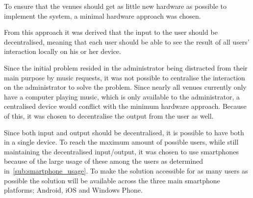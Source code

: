 To ensure that the venues should get as little new hardware as possible to implement the system, a minimal hardware approach was chosen.

From this approach it was derived that the input to the user should be decentralised, meaning that each user should be able to see the result of all users' interaction locally on his or her device.

Since the initial problem resided in the administrator being distracted from their main purpose by music requests, it was not possible to centralise the interaction on the administrator to solve the problem. Since nearly all venues currently only have a computer playing music, which is only available to the administrator, a centralised device would conflict with the minimum hardware approach. Because of this, it was chosen to decentralise the output from the user as well.

Since both input and output should be decentralised, it is possible to have both in a single device.
To reach the maximum amount of possible users, while still maintaining the decentralised input/output, it was chosen to use smartphones because of the large usage of these among the users as determined in~\cref{sub:smartphone_usage}. To make the solution accessible for as many users as possible the solution will be available across the three main smartphone platforms; Android, iOS and Windows Phone.
